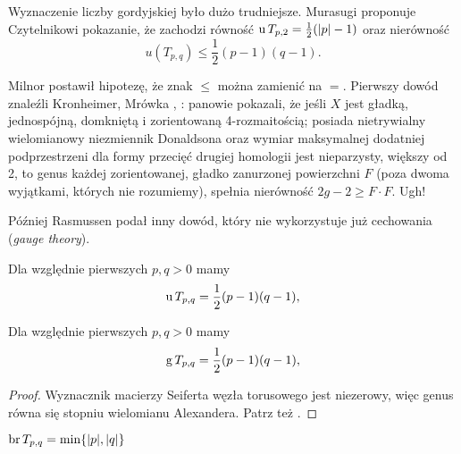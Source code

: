 Wyznaczenie liczby gordyjskiej było dużo trudniejsze.
Murasugi \cite[s. 150]{murasugi96} proponuje Czytelnikowi pokazanie, że zachodzi równość $\operatorname{u} T_{p, 2} = \frac 12 (|p| - 1)$ oraz nierówność
\begin{equation}
    u(T_{p, q}) \le \frac 12 (p-1)(q-1).
\end{equation}

Milnor \cite[uwaga 10.9]{milnor1968} postawił hipotezę, że znak $\le$ można zamienić na $=$.
%
Pierwszy dowód znaleźli Kronheimer, Mrówka \cite{kronheimer93}, \cite{kronheimer95}: panowie pokazali, że jeśli $X$ jest gładką, jednospójną, domkniętą i zorientowaną 4-rozmaitością; posiada nietrywialny wielomianowy niezmiennik Donaldsona oraz wymiar maksymalnej dodatniej podprzestrzeni dla formy przecięć drugiej homologii jest nieparzysty, większy od 2, to genus każdej zorientowanej, gładko zanurzonej powierzchni $F$ (poza dwoma wyjątkami, których nie rozumiemy), spełnia nierówność $2g - 2 \ge F \cdot F$.
Ugh!

Później Rasmussen \cite{rasmussen04} podał inny dowód, który nie wykorzystuje już cechowania (\emph{gauge theory}).

\begin{proposition}
%
\label{prp:torus_unknotting_number}%
    Dla względnie pierwszych $p, q > 0$ mamy
    \begin{equation}
        \operatorname{u} T_{p, q} = \frac 12 (p - 1)(q - 1),
    \end{equation}
\end{proposition}

\begin{proposition}
    Dla względnie pierwszych $p, q > 0$ mamy
    \begin{equation}
        \operatorname{g} T_{p, q} = \frac 12 (p - 1)(q - 1),
    \end{equation}
\end{proposition}

\begin{proof}
    Wyznacznik macierzy Seiferta węzła torusowego jest niezerowy, więc genus równa się stopniu wielomianu Alexandera.
    Patrz też \cite[s. 149]{murasugi96}.
\end{proof}

\begin{proposition}
%
    $\operatorname{br} T_{p, q} = \min \{|p|, |q|\}$
\end{proposition}

